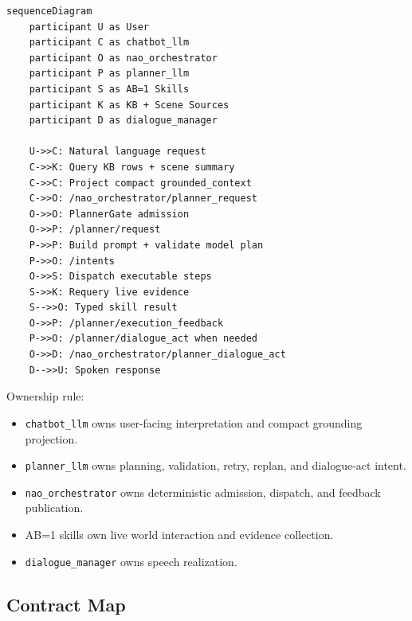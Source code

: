 \documentclass[12pt,a4paper]{article}
\newcommand{\code}[1]{\texttt{#1}}
\begin{document}
\begin{lstlisting}[caption={Diagram source from canonical Markdown}]
sequenceDiagram
    participant U as User
    participant C as chatbot_llm
    participant O as nao_orchestrator
    participant P as planner_llm
    participant S as AB=1 Skills
    participant K as KB + Scene Sources
    participant D as dialogue_manager

    U->>C: Natural language request
    C->>K: Query KB rows + scene summary
    C->>C: Project compact grounded_context
    C->>O: /nao_orchestrator/planner_request
    O->>O: PlannerGate admission
    O->>P: /planner/request
    P->>P: Build prompt + validate model plan
    P->>O: /intents
    O->>S: Dispatch executable steps
    S->>K: Requery live evidence
    S-->>O: Typed skill result
    O->>P: /planner/execution_feedback
    P->>O: /planner/dialogue_act when needed
    O->>D: /nao_orchestrator/planner_dialogue_act
    D-->>U: Spoken response
\end{lstlisting}

Ownership rule:

\begin{itemize}
\item \code{chatbot\_llm} owns user-facing interpretation and compact grounding projection.
\item \code{planner\_llm} owns planning, validation, retry, replan, and dialogue-act intent.
\item \code{nao\_orchestrator} owns deterministic admission, dispatch, and feedback publication.
\item AB=1 skills own live world interaction and evidence collection.
\item \code{dialogue\_manager} owns speech realization.
\end{itemize}



\subsection{Contract Map}
\end{document}
